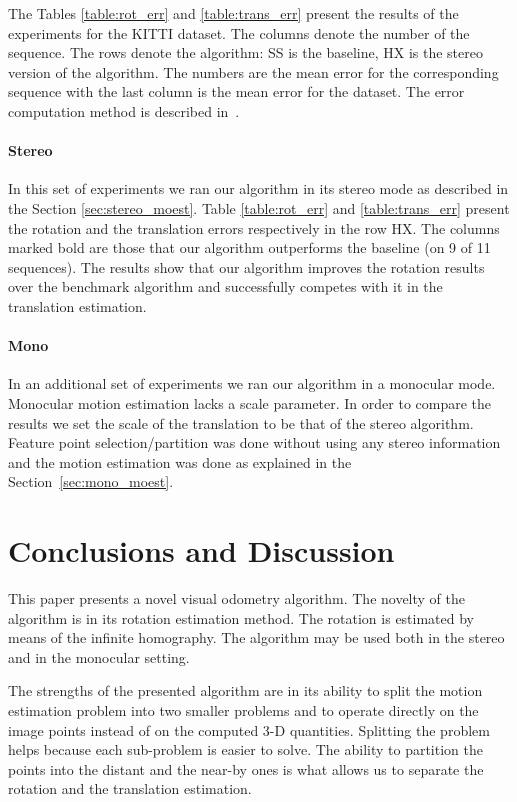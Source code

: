 \documentclass{report}
\begin{document}
The Tables \ref{table:rot_err} and \ref{table:trans_err} present the
results of the experiments for the KITTI dataset. The columns denote
the number of the sequence.  The rows denote the algorithm: SS is the
baseline, HX is the stereo version of the algorithm.  The numbers are
the mean error for the corresponding sequence with the last column is
the mean error for the dataset. The error computation method is
described in~\cite{Geiger2012}.

\paragraph{Stereo} In this set of experiments we ran our algorithm in
its stereo mode as described in the Section \ref{sec:stereo_moest}.
Table \ref{table:rot_err} and \ref{table:trans_err} present the
rotation and the translation errors respectively in the row HX. The
columns marked bold are those that our algorithm outperforms the
baseline (on 9 of 11 sequences). The results show that our algorithm improves the
rotation results over the benchmark algorithm and successfully
competes with it in the translation estimation.

\paragraph{Mono} In an additional set of experiments we ran our
algorithm in a monocular mode. Monocular motion estimation lacks a
scale parameter. In order to compare the results we set the
scale of the translation to be that of the stereo algorithm.  Feature
point selection/partition was done without using any stereo
information and the motion estimation was done as explained in the
Section~\ref{sec:mono_moest}.

\section{Conclusions and Discussion}
This paper presents a novel visual odometry algorithm.  The novelty of
the algorithm is in its rotation estimation method.  The rotation is
estimated by means of the infinite homography.  The algorithm may be
used both in the stereo and in the monocular setting.

The strengths of the presented algorithm are in its ability to split
the motion estimation problem into two smaller problems and to operate
directly on the image points instead of on the computed 3-D
quantities.  Splitting the problem helps because each sub-problem is
easier to solve.  The ability to partition the points into the distant
and the near-by ones is what allows us to separate the rotation and
the translation estimation.  
\end{document}
